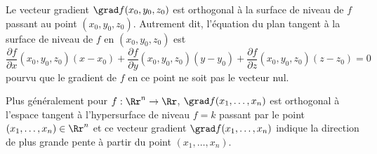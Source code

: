 \begin{proposition}{}{}
	Le vecteur gradient $\grad f(x_0,y_0,z_0)$ est orthogonal à la surface de niveau de $f$ passant au point $(x_0,y_0,z_0)$. Autrement dit,
	l'équation du plan tangent à la surface de niveau de $f$ en $(x_0,y_0,z_0)$ est 
	$$\frac{\partial f}{\partial x}(x_0,y_0,z_0)(x-x_0)
	+\frac{\partial f}{\partial y}(x_0,y_0,z_0)(y-y_0)
	+\frac{\partial f}{\partial z}(x_0,y_0,z_0)(z-z_0)
	= 0 $$
	pourvu que le gradient de $f$ en ce point ne soit pas le vecteur nul.
\end{proposition}




Plus généralement pour $f : \Rr^n \to \Rr$, $\grad f (x_1,\ldots,x_n)$ est orthogonal à l'espace tangent à
l'hypersurface de niveau $f=k$ passant par le point $(x_1,\ldots,x_n)\in\Rr^n$ et 
ce vecteur gradient $\grad f(x_1,\ldots,x_n)$ indique la direction de plus grande pente à partir du point $(x_1,\ldots,x_n)$.





